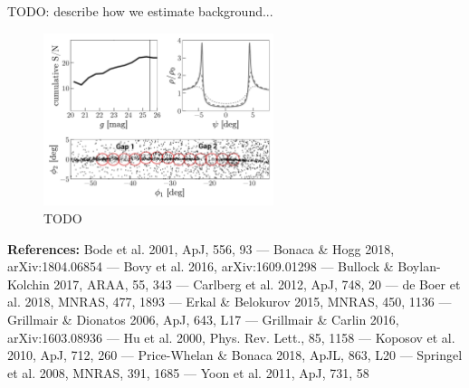 \documentclass[11pt]{article}
\begin{document}
TODO: describe how we estimate background...


\begin{figure}[t]
\begin{center}
\includegraphics[width=0.6\textwidth]{figure1.pdf}
\caption{TODO}
\label{fig:}
\end{center}
\end{figure}

\textbf{References:}
Bode et al. 2001, ApJ, 556, 93 ---
Bonaca \& Hogg 2018, arXiv:1804.06854 ---
Bovy et al. 2016, arXiv:1609.01298 ---
Bullock \& Boylan-Kolchin 2017, ARAA, 55, 343 ---
Carlberg et al. 2012, ApJ, 748, 20 ---
de Boer et al. 2018, MNRAS, 477, 1893 ---
Erkal \& Belokurov 2015, MNRAS, 450, 1136 ---
Grillmair \& Dionatos 2006, ApJ, 643, L17 ---
Grillmair \& Carlin 2016, arXiv:1603.08936 ---
Hu et al. 2000, Phys. Rev. Lett., 85, 1158 ---
Koposov et al. 2010, ApJ, 712, 260 ---
Price-Whelan \& Bonaca 2018, ApJL, 863, L20 ---
Springel et al. 2008, MNRAS, 391, 1685 ---
Yoon et al. 2011, ApJ, 731, 58
\end{document}
